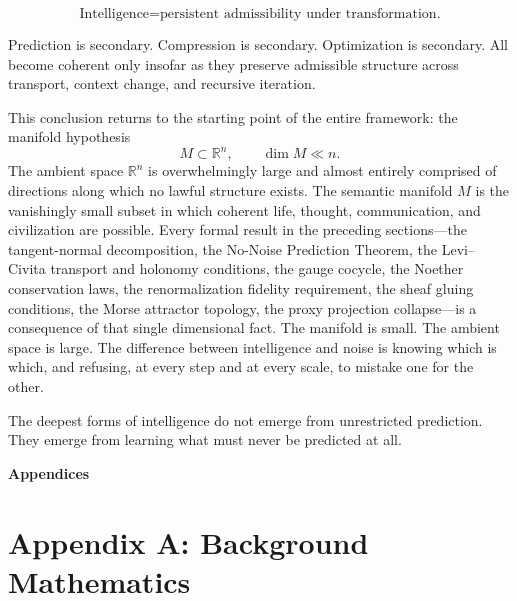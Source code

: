\documentclass[11pt,a4paper,twocolumn]{article}
\begin{document}
\[
\text{Intelligence}
=
\text{persistent admissibility under transformation.}
\]

Prediction is secondary. Compression is secondary. Optimization
is secondary. All become coherent only insofar as they preserve
admissible structure across transport, context change, and
recursive iteration.

This conclusion returns to the starting point of the entire
framework: the manifold hypothesis
\[
M \subset \mathbb{R}^n, \qquad \dim M \ll n.
\]
The ambient space $\mathbb{R}^n$ is overwhelmingly large and almost
entirely comprised of directions along which no lawful structure
exists. The semantic manifold $M$ is the vanishingly small subset
in which coherent life, thought, communication, and civilization
are possible. Every formal result in the preceding sections---the
tangent-normal decomposition, the No-Noise Prediction Theorem,
the Levi--Civita transport and holonomy conditions, the gauge
cocycle, the Noether conservation laws, the renormalization
fidelity requirement, the sheaf gluing conditions, the Morse
attractor topology, the proxy projection collapse---is a
consequence of that single dimensional fact. The manifold is
small. The ambient space is large. The difference between
intelligence and noise is knowing which is which, and refusing,
at every step and at every scale, to mistake one for the other.

The deepest forms of intelligence do not emerge from unrestricted
prediction. They emerge from learning what must never be
predicted at all.


\twocolumn[
\vspace{1em}
]

\onecolumn
\begin{center}
\Large\bfseries Appendices
\end{center}
\vspace{1.5em}


\section*{Appendix A: Background Mathematics}
\end{document}
